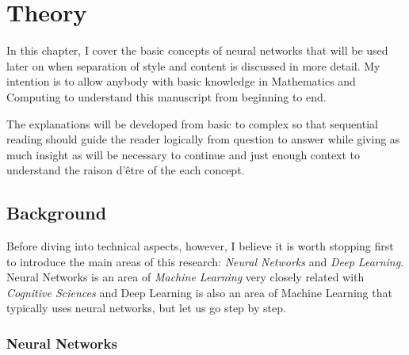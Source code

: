 
\chapter{Theory}
\label{chap:theory}


In this chapter, I cover the basic concepts of neural networks that will be used later on when separation of style and content is discussed in more detail.
My intention is to allow anybody with basic knowledge in Mathematics and Computing to understand this manuscript from beginning to end.

The explanations will be developed from basic to complex so that sequential reading should guide the reader logically from question to answer while giving as much insight as will be necessary to continue and just enough context to understand the raison d'être of the each concept.



\section{Background}
\label{sec:theory:background}

Before diving into technical aspects, however, I believe it is worth stopping first to introduce the main areas of this research: \emph{Neural Networks} and \emph{Deep Learning}.
Neural Networks is an area of \emph{Machine Learning} very closely related with \emph{Cognitive Sciences} and Deep Learning is also an area of Machine Learning that typically uses neural networks, but let us go step by step.


\subsection{Neural Networks}
\label{sub:theory:background:neural-networks}

